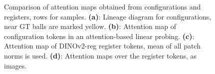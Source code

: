 \begin{figure}[ht]
  \centering
  \caption{
    Comparison of attention maps obtained from configurations and registers, rows for samples.
    \textbf{(a)}: Lineage diagram for configurations, near GT balls are marked yellow.
    \textbf{(b)}: Attention map of configuration tokens in an attention-based linear probing.
    \textbf{(c)}: Attention map of DINOv2-reg register tokens, mean of all patch norms is used.
    \textbf{(d)}: Attention maps over the register tokens, as images.
  }
  \label{fig:similar_behavior}
\end{figure}

